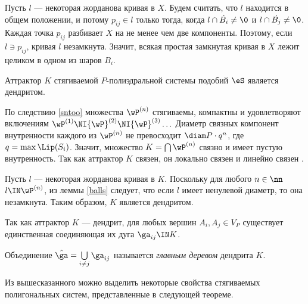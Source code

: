  Пусть $l$ --- некоторая   жорданова кривая в $X$. Будем считать, что $l$ находится в общем положении, и потому $p_{ij}\in l$ только тогда, когда $l\cap \dot{B_i}\neq\0$ и $l\cap \dot{B_j}\neq\0$.
 Каждая точка $p_{ij}$ разбивает $X$ на не менее чем две компоненты. Поэтому, если $l\ni p_{ij}$, кривая $l$ незамкнута.
 Значит, всякая простая замкнутая кривая в $X$ лежит целиком  в одном из шаров $B_i$.\vse


\begin{theorem}\label{main} Аттрактор $K$  стягиваемой  $P$-полиэдральной  системы подобий $\eS$ является дендритом.\end{theorem}

\proof   По следствию \ref{sntoo}  множества
${\wP}^{(n)}$ стягиваемы, компактны и удовлетворяют включениям
${\wP}^{(1)} \NI {\wP}^{(2)}\NI  {\wP}^{(3)} \ldots$ Диаметр
связных компонент внутренности каждого из ${\wP}^{(n)}$ не
превосходит ${\diam}{P}\cdot {q^n}$, где $q = \max\Lip(S_i)$.
Значит, множество $K = \bigcap {\wP}^{(n)}$ связно и имеет пустую
внутренность. Так как аттрактор $K$ связен, он локально
связен и линейно связен \cite[теорема 1.6.2, предложение
1.6.4]{Kig}. 

Пусть $l$ --- некоторая   жорданова кривая в $K$. Поскольку для любого $n\in \nn$\ \  $l\IN\wP^{(n)}$, из  леммы \ref{balls} следует, что если $l$ имеет ненулевой диаметр, то она  незамкнута. Таким образом, $K$ является дендритом. {\vse}

Так как аттрактор $K$ --- дендрит, для любых вершин $A_i,A_j \in V_P$ существует единственная соединяющая их дуга ${\ga}_{ij}\IN K$.

\begin{definition}
Объединение $\hat\ga=\bigcup\limits_{i\neq j}\ga_{ij}$ называется {\em главным деревом} дендрита $K$. 
\end{definition}

Из вышесказанного можно выделить некоторые свойства стягиваемых полигональных систем, представленные в следующей теореме.

